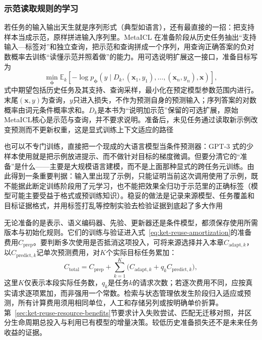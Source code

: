 \subsubsection{示范读取规则的学习}
\label{sec:ket-transfer-demonstration-reading}

若任务的输入输出天生就是序列形式（典型如语言），还有最直接的一招：把支持样本当成示范，原样拼进输入序列里。MetaICL 在准备阶段从历史任务抽出“支持输入—标签对”和独立查询，把示范和查询拼成一个序列，用查询正确答案的负对数概率去训练“读懂示范并照着做”的能力。用可选说明扩展这一接口，准备目标写为
\begin{equation}
  \min_{\bm\phi}
  \mathbb E_k\left[
    -\log p_{\bm\phi}
       (y\mid D_k,(\bm x_1,y_1),\ldots,(\bm x_n,y_n),\bm x)
  \right],
  \label{eq:ket-transfer-metaicl}
\end{equation}
式中期望包括历史任务及其支持、查询采样，最小化在预定模型参数范围内进行。末尾$(\bm x,y)$为查询，$y$只进入损失，不作为预测自身的预测输入；序列答案的对数概率由词元条件概率求和。$D_k$是本书为“说明加示范”保留的可选扩展，原始MetaICL核心是示范与查询，并不要求说明。准备后，未见任务通过读取新示例改变预测而不更新权重，这是显式训练上下文适应的路径

也可以不专门训练，直接把一个现成的大语言模型当条件预测器：GPT-3 式的少样本使用就是把示例放进提示、而不做针对目标的梯度微调。但要分清它的“准备”是什么——主要是大规模语言建模，而不是上面那种显式的跨任务元训练。由此得到一条重要判据：输入里出现了示例，只能证明当前这次调用使用了示例，既不能据此断定训练阶段用了元学习，也不能把效果全归功于示范里的正确标签（模型可能主要受益于格式或预训练知识）。稳妥的做法是记录来源模型、任务覆盖和目标证据格式，并用标签打乱等控制实验去检验证据到底起了多大作用

无论准备的是表示、语义编码器、先验、更新器还是条件模型，都须保存使用所需版本与初始化规则。它们的训练与验证进入式~\eqref{eq:ket-reuse-amortization}的准备费用$C_{\mathrm{prep}}$。要判断多次使用是否抵消这项投入，可将来源选择并入本章$C_{\mathrm{adapt},k}$，以$C_{\mathrm{predict},k}$记单次预测费用，对$K$个实际目标任务累加：
\begin{equation}
  C_{\mathrm{total}}
    =C_{\mathrm{prep}}
     +\sum_{k=1}^{K}
       \bigl(C_{\mathrm{adapt},k}+q_kC_{\mathrm{predict},k}\bigr),
  \label{eq:ket-transfer-total-cost}
\end{equation}
这里$K$仅表示本段实际任务数，$q_k$是任务$k$的请求次数；若逐次费用不同，应按真实请求逐项累加，而非强用一个常数。检索与状态管理依发生阶段归入适应或预测，所有计算费用须用相同单位，人工和存储另列或按明确单价折算。第~\ref{sec:ket-reuse-resource-benefits}节要求计入失败尝试、匹配无迁移对照，并区分生命周期总投入与利用已有模型的增量决策。较低历史准备损失还不是未来任务收益的证据。


